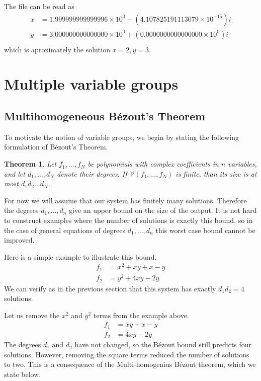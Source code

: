 \documentclass[12pt]{article}
\newtheorem{theorem}{Theorem}[section]
\theoremstyle{definition}
\begin{document}
\noindent The file can be read as
\begin{align*}
    x &= 1.999999999999996 \times 10^0 - (4.107825191113079 \times 
    10^{-15})i\\
    y &= 3.000000000000000 \times 10^0 + (0.0000000000000000 \times 
    10^{0})i\\
\end{align*}
which is aproximately the solution $x = 2, y = 3$.


\section{Multiple variable groups}
\subsection{Multihomogeneous B\'{e}zout's Theorem}
To motivate the notion of variable groups, we begin by stating the 
following formulation of B\'{e}zout's Theorem.

\begin{theorem}
Let $f_1, \ldots, f_N$ be polynomials with complex coefficients in $n$ 
variables, and let $d_1, \ldots, d_N$ denote their degrees. If 
$\mathcal{V}(f_1, \ldots, f_N)$ is finite, than its size is at most 
$d_1d_2 \ldots d_N$. 
\end{theorem}

For now we will assume that our system has finitely many solutions.
Therefore the degrees $d_1, \ldots, d_n$ give an upper bound on the size 
of the output. It is not hard to construct examples where the number of 
solutions is exactly this bound, so in the case of general equations of 
degrees $d_1, \ldots, d_n$ this worst case bound cannot be improved.

Here is a simple example to illustrate this bound.
\begin{align*}
    f_1 &= x^2 + xy + x - y\\
    f_2 &= y^2 + 4xy - 2y
\end{align*}
We can verify as in the previous section that this system has exactly 
$d_1d_2 = 4$ solutions.

Let us remove the $x^2$ and $y^2$ terms from the example above.
\begin{align*}
    f_1 &= xy + x - y\\
    f_2 &= 4xy - 2y
\end{align*}
The degrees $d_1$ and $d_2$ have not changed, so the B\'{e}zout bound 
still predicts four solutions. However, removing the square terms 
reduced the number of solutions to two. This is a consequence of the 
Multi-homogenius B\'{e}zout theorem, which we state below.
\end{document}

